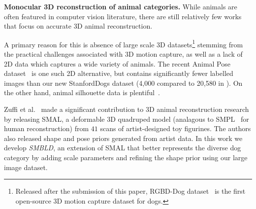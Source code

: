 \textbf{Monocular 3D reconstruction of animal categories.}
While animals are often featured in computer vision literature, there are still relatively few works that focus on accurate 3D animal reconstruction. 

A primary reason for this is absence of large scale 3D datasets\footnote{Released after the submission of this paper, RGBD-Dog dataset~\cite{Kearney_2020_CVPR} is the first open-source 3D motion capture dataset for dogs.} stemming from the practical challenges associated with 3D motion capture, as well as a lack of 2D data which captures a wide variety of animals. The recent Animal Pose dataset~\cite{animalpose} is one such 2D alternative, but contains significantly fewer labelled images than our new StanfordDogs dataset (4,000 compared to 20,580 in ). 
On the other hand, animal silhouette data is plentiful~\cite{lin2014microsoft,everingham2010pascal,DAVIS2017-2nd}.


Zuffi et al.~\cite{zuffi2017menagerie} made a significant contribution to 3D animal reconstruction research by releasing SMAL, a deformable 3D quadruped model (analagous to SMPL~\cite{loper15smpl} for human reconstruction) from $41$ scans of artist-designed toy figurines. The authors also released shape and pose priors generated from artist data. In this work we develop \emph{SMBLD}, an extension of SMAL that better represents the diverse dog category by adding scale parameters and refining the shape prior using our large image dataset.





